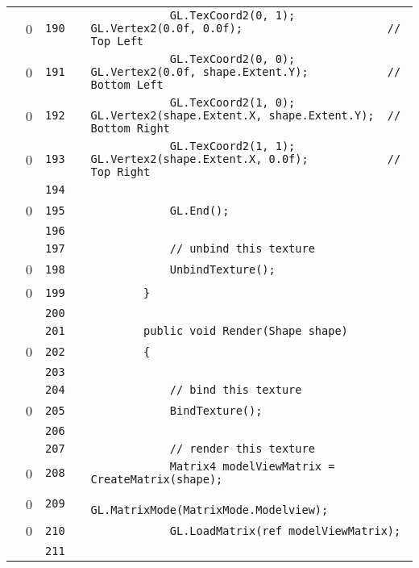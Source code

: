 \documentclass[a4paper,landscape,10pt]{article}
\begin{document}
\begin{longtable}[l]{lrrll}
\cellcolor{red} & 0 & \verb~190~ & & \verb~            GL.TexCoord2(0, 1); GL.Vertex2(0.0f, 0.0f);                      // Top Left~\\
\cellcolor{red} & 0 & \verb~191~ & & \verb~            GL.TexCoord2(0, 0); GL.Vertex2(0.0f, shape.Extent.Y);            // Bottom Left~\\
\cellcolor{red} & 0 & \verb~192~ & & \verb~            GL.TexCoord2(1, 0); GL.Vertex2(shape.Extent.X, shape.Extent.Y);  // Bottom Right~\\
\cellcolor{red} & 0 & \verb~193~ & & \verb~            GL.TexCoord2(1, 1); GL.Vertex2(shape.Extent.X, 0.0f);            // Top Right~\\
\cellcolor{gray} &  & \verb~194~ & & \verb~~\\
\cellcolor{red} & 0 & \verb~195~ & & \verb~            GL.End();~\\
\cellcolor{gray} &  & \verb~196~ & & \verb~~\\
\cellcolor{gray} &  & \verb~197~ & & \verb~            // unbind this texture~\\
\cellcolor{red} & 0 & \verb~198~ & & \verb~            UnbindTexture();~\\
\cellcolor{red} & 0 & \verb~199~ & & \verb~        }~\\
\cellcolor{gray} &  & \verb~200~ & & \verb~~\\
\cellcolor{gray} &  & \verb~201~ & & \verb~        public void Render(Shape shape)~\\
\cellcolor{red} & 0 & \verb~202~ & & \verb~        {~\\
\cellcolor{gray} &  & \verb~203~ & & \verb~~\\
\cellcolor{gray} &  & \verb~204~ & & \verb~            // bind this texture~\\
\cellcolor{red} & 0 & \verb~205~ & & \verb~            BindTexture();~\\
\cellcolor{gray} &  & \verb~206~ & & \verb~~\\
\cellcolor{gray} &  & \verb~207~ & & \verb~            // render this texture~\\
\cellcolor{red} & 0 & \verb~208~ & & \verb~            Matrix4 modelViewMatrix = CreateMatrix(shape);~\\
\cellcolor{red} & 0 & \verb~209~ & & \verb~            GL.MatrixMode(MatrixMode.Modelview);~\\
\cellcolor{red} & 0 & \verb~210~ & & \verb~            GL.LoadMatrix(ref modelViewMatrix);~\\
\cellcolor{gray} &  & \verb~211~ & & \verb~~\\

\end{longtable}
\end{document}
